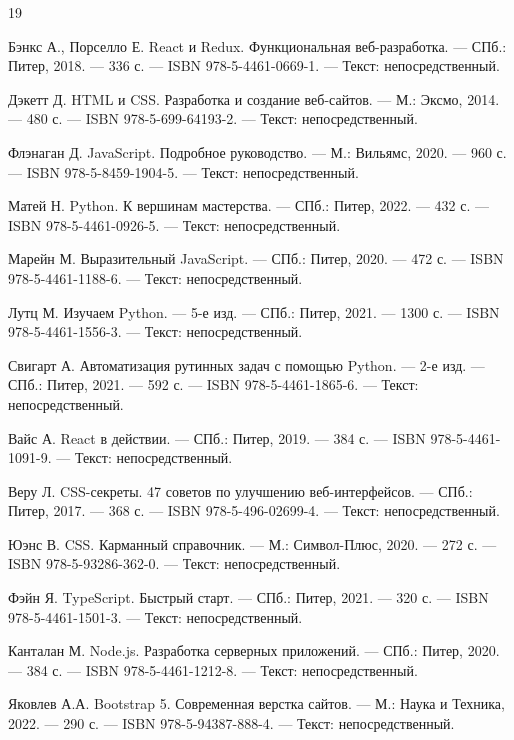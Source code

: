 
\begin{thebibliography}{19}

     Бэнкс А., Порселло Е. React и Redux. Функциональная веб-разработка. — СПб.: Питер, 2018. — 336 с. — ISBN 978-5-4461-0669-1. — Текст: непосредственный.

     Дэкетт Д. HTML и CSS. Разработка и создание веб-сайтов. — М.: Эксмо, 2014. — 480 с. — ISBN 978-5-699-64193-2. — Текст: непосредственный.

     Флэнаган Д. JavaScript. Подробное руководство. — М.: Вильямс, 2020. — 960 с. — ISBN 978-5-8459-1904-5. — Текст: непосредственный.

     Матей Н. Python. К вершинам мастерства. — СПб.: Питер, 2022. — 432 с. — ISBN 978-5-4461-0926-5. — Текст: непосредственный.

     Марейн М. Выразительный JavaScript. — СПб.: Питер, 2020. — 472 с. — ISBN 978-5-4461-1188-6. — Текст: непосредственный.

     Лутц М. Изучаем Python. — 5-е изд. — СПб.: Питер, 2021. — 1300 с. — ISBN 978-5-4461-1556-3. — Текст: непосредственный.

     Свигарт А. Автоматизация рутинных задач с помощью Python. — 2-е изд. — СПб.: Питер, 2021. — 592 с. — ISBN 978-5-4461-1865-6. — Текст: непосредственный.

     Вайс А. React в действии. — СПб.: Питер, 2019. — 384 с. — ISBN 978-5-4461-1091-9. — Текст: непосредственный.

     Веру Л. CSS-секреты. 47 советов по улучшению веб-интерфейсов. — СПб.: Питер, 2017. — 368 с. — ISBN 978-5-496-02699-4. — Текст: непосредственный.

     Юэнс В. CSS. Карманный справочник. — М.: Символ-Плюс, 2020. — 272 с. — ISBN 978-5-93286-362-0. — Текст: непосредственный.

     Фэйн Я. TypeScript. Быстрый старт. — СПб.: Питер, 2021. — 320 с. — ISBN 978-5-4461-1501-3. — Текст: непосредственный.

     Канталан М. Node.js. Разработка серверных приложений. — СПб.: Питер, 2020. — 384 с. — ISBN 978-5-4461-1212-8. — Текст: непосредственный.

     Яковлев А.А. Bootstrap 5. Современная верстка сайтов. — М.: Наука и Техника, 2022. — 290 с. — ISBN 978-5-94387-888-4. — Текст: непосредственный.


\end{thebibliography}
